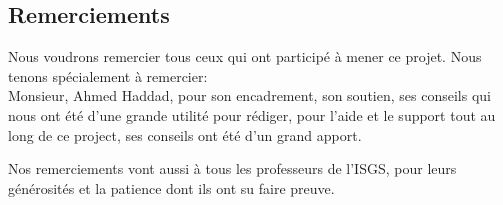 \begin{center}
\section*{Remerciements}
\end{center}
\vspace{0.5cm}
\large
\noindent
Nous voudrons remercier tous ceux qui ont participé à mener ce projet. Nous tenons spécialement à remercier: \\

\noindent
Monsieur, Ahmed Haddad, pour son encadrement, son soutien, ses conseils qui nous ont été d'une grande utilité pour rédiger, pour l'aide et le support tout au long de ce project, ses conseils ont été d'un grand apport.

\vspace{0.5cm}
\noindent
Nos remerciements vont aussi à tous les professeurs de l'ISGS, pour leurs générosités et la patience dont ils ont su faire preuve.

\newpage